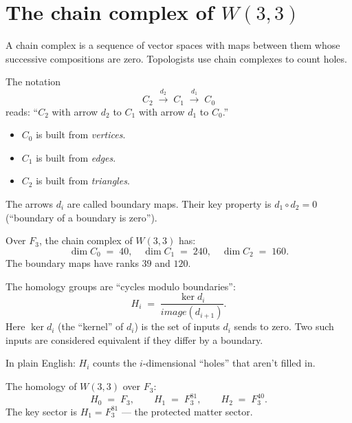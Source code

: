 \documentclass[11pt]{article}
\def\mathbb#1{#1}%
\def\mathrm#1{#1}%
\def\textbf#1{#1}%
\newcommand{\W}{W(3,3)}
\begin{document}
\section{\texorpdfstring{The chain complex of $\W$}{The chain complex of W(3,3)}}

\begin{mathnote}
A \textbf{chain complex} is a sequence of vector spaces with maps between them whose successive compositions are zero. Topologists use chain complexes to count holes.

The notation
\[
C_2 \;\xrightarrow{d_2}\; C_1 \;\xrightarrow{d_1}\; C_0
\]
reads: ``$C_2$ with arrow $d_2$ to $C_1$ with arrow $d_1$ to $C_0$.''

\begin{itemize}[leftmargin=2em]
\item $C_0$ is built from \emph{vertices}.
\item $C_1$ is built from \emph{edges}.
\item $C_2$ is built from \emph{triangles}.
\end{itemize}

The arrows $d_i$ are called \textbf{boundary maps}. Their key property is $d_1 \circ d_2 = 0$ (``boundary of a boundary is zero'').
\end{mathnote}

Over $\mathbb{F}_3$, the chain complex of $\W$ has:
\[
\dim C_0 \;=\; 40, \quad \dim C_1 \;=\; 240, \quad \dim C_2 \;=\; 160.
\]
The boundary maps have ranks $39$ and $120$.

\begin{mathnote}
The \textbf{homology groups} are ``cycles modulo boundaries'':
\[
H_i \;=\; \frac{\ker d_i}{\mathrm{image}(d_{i+1})}.
\]
Here $\ker d_i$ (the ``kernel'' of $d_i$) is the set of inputs $d_i$ sends to zero. Two such inputs are considered equivalent if they differ by a boundary.

In plain English: $H_i$ counts the $i$-dimensional ``holes'' that aren't filled in.
\end{mathnote}

The homology of $\W$ over $\mathbb{F}_3$:
\[
H_0 \;=\; \mathbb{F}_3, \qquad H_1 \;=\; \mathbb{F}_3^{81}, \qquad H_2 \;=\; \mathbb{F}_3^{40}.
\]
The key sector is $H_1 = \mathbb{F}_3^{81}$ --- the \textbf{protected matter sector}.
\end{document}
